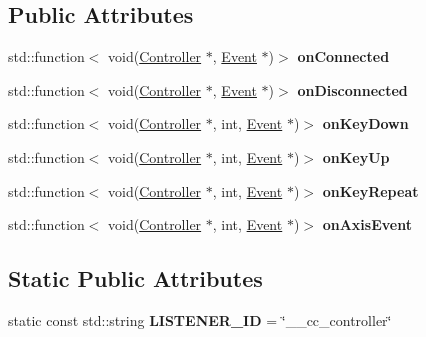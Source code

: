 \subsection*{Public Attributes}
\begin{DoxyCompactItemize}
\item 
\mbox{\label{classEventListenerController_a086a0a496344e691c2fd34a92006dcef}} 
std\+::function$<$ void(\hyperlink{classController}{Controller} $\ast$, \hyperlink{classEvent}{Event} $\ast$)$>$ {\bfseries on\+Connected}
\item 
\mbox{\label{classEventListenerController_a498d63271a1eb7baa2965d6b7744b38f}} 
std\+::function$<$ void(\hyperlink{classController}{Controller} $\ast$, \hyperlink{classEvent}{Event} $\ast$)$>$ {\bfseries on\+Disconnected}
\item 
\mbox{\label{classEventListenerController_af45c6460909691c3370864e5dcdf2dad}} 
std\+::function$<$ void(\hyperlink{classController}{Controller} $\ast$, int, \hyperlink{classEvent}{Event} $\ast$)$>$ {\bfseries on\+Key\+Down}
\item 
\mbox{\label{classEventListenerController_aa646ef83e385083b20f533c277b550eb}} 
std\+::function$<$ void(\hyperlink{classController}{Controller} $\ast$, int, \hyperlink{classEvent}{Event} $\ast$)$>$ {\bfseries on\+Key\+Up}
\item 
\mbox{\label{classEventListenerController_a169db598f65b7f0c764a19972088ad77}} 
std\+::function$<$ void(\hyperlink{classController}{Controller} $\ast$, int, \hyperlink{classEvent}{Event} $\ast$)$>$ {\bfseries on\+Key\+Repeat}
\item 
\mbox{\label{classEventListenerController_a40027ab5d2a1acc68b5411767c0695ac}} 
std\+::function$<$ void(\hyperlink{classController}{Controller} $\ast$, int, \hyperlink{classEvent}{Event} $\ast$)$>$ {\bfseries on\+Axis\+Event}
\end{DoxyCompactItemize}
\subsection*{Static Public Attributes}
\begin{DoxyCompactItemize}
\item 
\mbox{\label{classEventListenerController_ada2015a3c1919be5ba768f9aa370a7e1}} 
static const std\+::string {\bfseries L\+I\+S\+T\+E\+N\+E\+R\+\_\+\+ID} = \char`\"{}\+\_\+\+\_\+cc\+\_\+controller\char`\"{}
\end{DoxyCompactItemize}
